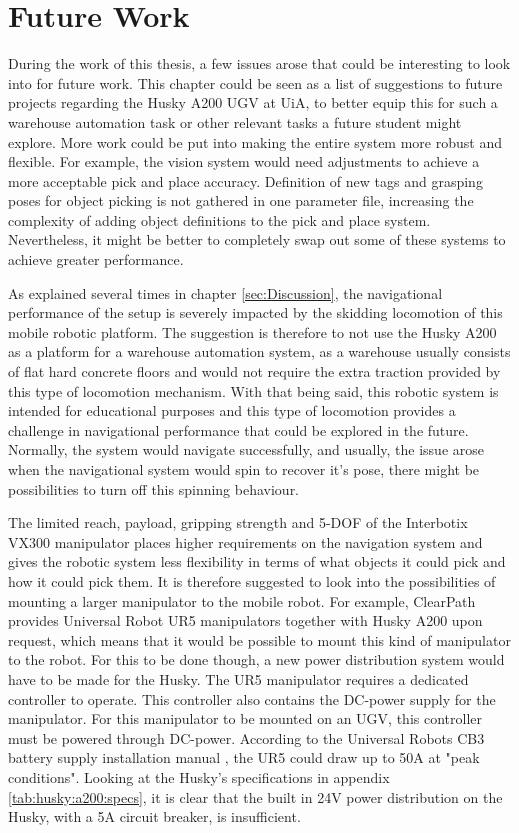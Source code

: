 \chapter{Future Work}
During the work of this thesis, a few issues arose that could be interesting to look into for future work. This chapter could be seen as a list of suggestions to future projects regarding the Husky A200 UGV at UiA, to better equip this for such a warehouse automation task or other relevant tasks a future student might explore. More work could be put into making the entire system more robust and flexible. For example, the vision system would need adjustments to achieve a more acceptable pick and place accuracy. Definition of new tags and grasping poses for object picking is not gathered in one parameter file, increasing the complexity of adding object definitions to the pick and place system. Nevertheless, it might be better to completely swap out some of these systems to achieve greater performance.

As explained several times in chapter \ref{sec:Discussion}, the navigational performance of the setup is severely impacted by the skidding locomotion of this mobile robotic platform. The suggestion is therefore to not use the Husky A200 as a platform for a warehouse automation system, as a warehouse usually consists of flat hard concrete floors and would not require the extra traction provided by this type of locomotion mechanism. With that being said, this robotic system is intended for educational purposes and this type of locomotion provides a challenge in navigational performance that could be explored in the future. Normally, the system would navigate successfully, and usually, the issue arose when the navigational system would spin to recover it's pose, there might be possibilities to turn off this spinning behaviour.

The limited reach, payload, gripping strength and 5-DOF of the Interbotix VX300 manipulator places higher requirements on the navigation system and gives the robotic system less flexibility in terms of what objects it could pick and how it could pick them. It is therefore suggested to look into the possibilities of mounting a larger manipulator to the mobile robot. For example, ClearPath provides Universal Robot UR5 manipulators together with Husky A200 upon request, which means that it would be possible to mount this kind of manipulator to the robot. For this to be done though, a new power distribution system would have to be made for the Husky. The UR5 manipulator requires a dedicated controller to operate. This controller also contains the DC-power supply for the manipulator. For this manipulator to be mounted on an UGV, this controller must be powered through DC-power. According to the Universal Robots CB3 battery supply installation manual \cite{ur5_battery_manual}, the UR5 could draw up to 50A at "peak conditions". Looking at the Husky's specifications in appendix \ref{tab:husky:a200:specs}, it is clear that the built in 24V power distribution on the Husky, with a 5A circuit breaker, is insufficient.

